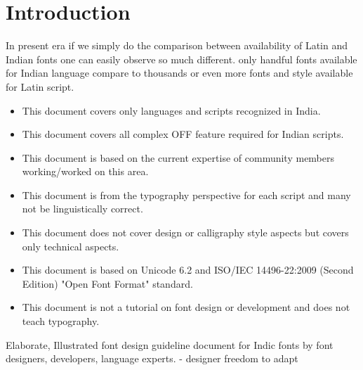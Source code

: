 \chapter{Introduction}



In present era if we simply do the comparison between availability of Latin and Indian fonts one can easily observe so much different. only handful fonts available for Indian language compare to thousands or even more fonts and style available for Latin script.



\begin{itemize}
\item This document covers only languages and scripts recognized in India.
\item This document covers all complex OFF feature required for Indian scripts.
\item This document is based on the current expertise of community members working/worked on this area.
\item This document is from the typography perspective for each script and many not be linguistically correct.
\item This document does not cover design or calligraphy style aspects but covers only technical aspects.
\item This document is based on Unicode 6.2 and ISO/IEC 14496-22:2009 (Second Edition) "Open Font Format" standard.
\item This document is not a tutorial on font design or development and does not teach typography.
\end{itemize}


Elaborate, Illustrated font design guideline document for Indic fonts by font designers, developers, language experts.
- designer freedom to adapt



